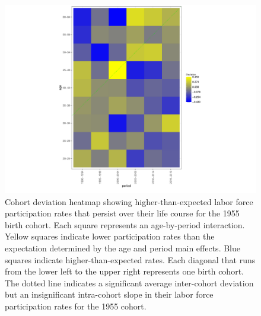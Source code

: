 
\begin{figure}[htbp]
  \centering
  \includegraphics[width=1.2\linewidth]{figure2.pdf}
  \caption{Cohort deviation heatmap showing higher-than-expected labor force participation rates that persist over their life course for the 1955 birth cohort.  Each square represents an age-by-period interaction. Yellow squares indicate lower participation rates than the expectation determined by the age and period main effects. Blue squares indicate higher-than-expected rates. Each diagonal that runs from the lower left to the upper right represents one birth cohort. The dotted line indicates a significant average inter-cohort deviation but an insignificant intra-cohort slope in their labor force participation rates for the 1955 cohort.}
  \label{figure:2}
\end{figure}

